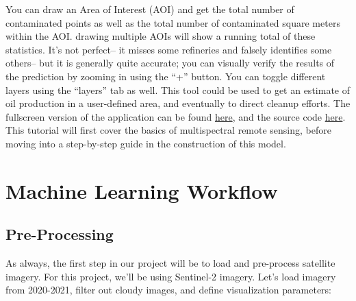 \documentclass[
  letterpaper,
  DIV=11,
  numbers=noendperiod]{scrreprt}
\begin{document}
You can draw an Area of Interest (AOI) and get the total number of
contaminated points as well as the total number of contaminated square
meters within the AOI. drawing multiple AOIs will show a running total
of these statistics. It's not perfect-- it misses some refineries and
falsely identifies some others-- but it is generally quite accurate; you
can visually verify the results of the prediction by zooming in using
the ``+'' button. You can toggle different layers using the ``layers''
tab as well. This tool could be used to get an estimate of oil
production in a user-defined area, and eventually to direct cleanup
efforts. The fullscreen version of the application can be found
\href{https://ollielballinger.users.earthengine.app/view/rojavaoil}{here},
and the source code
\href{https://code.earthengine.google.com/7a80f10412e1eb2a4d2c5d95989e70bd}{here}.
This tutorial will first cover the basics of multispectral remote
sensing, before moving into a step-by-step guide in the construction of
this model.

\hypertarget{machine-learning-workflow}{%
\chapter*{Machine Learning Workflow}\label{machine-learning-workflow}}


\hypertarget{pre-processing-2}{%
\section*{Pre-Processing}\label{pre-processing-2}}


As always, the first step in our project will be to load and pre-process
satellite imagery. For this project, we'll be using Sentinel-2 imagery.
Let's load imagery from 2020-2021, filter out cloudy images, and define
visualization parameters:
\end{document}
